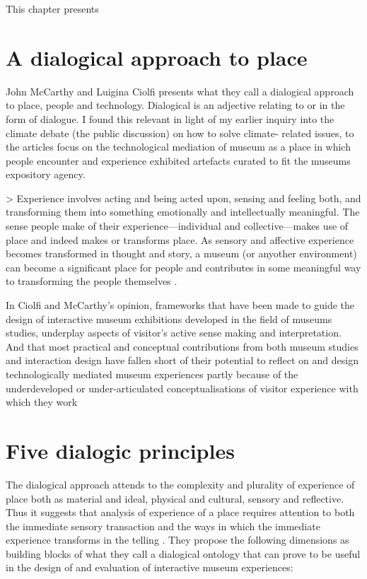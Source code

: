 This chapter presents 


\section{A dialogical approach to place}
John McCarthy and Luigina Ciolfi presents what they call a dialogical approach to place, people and technology. Dialogical is an adjective relating to or in the form of dialogue. I found this relevant in light of my earlier inquiry into the climate debate (the public discussion) on how to solve climate- related issues, to the articles focus on the technological mediation of museum as a place in which people encounter and experience exhibited artefacts curated to fit the museums expository agency.

> Experience involves acting and being acted upon, sensing and feeling both, and transforming them into something emotionally and intellectually meaningful. The sense people make of their experience—individual and collective—makes use of place and indeed makes or transforms place. As sensory and affective experience becomes transformed in thought and story, a museum (or anyother environment) can become a significant place for people and contributes in some meaningful way to transforming the people themselves \autocite[p. 250]{mccarthy_place}.

In Ciolfi and McCarthy’s opinion, frameworks that have been made to guide the design of interactive museum exhibitions developed in the field of museums studies, underplay aspects of visitor’s active sense making and interpretation. And that most practical and conceptual contributions from both museum studies and interaction design have fallen short of their potential to reflect on and design technologically mediated museum experiences partly because of the underdeveloped or under-articulated conceptualisations of visitor experience with which they work \autocite[p. 248]{mccarthy_place}


\section{Five dialogic principles}
The dialogical approach attends to the complexity and plurality of experience of place both as material and ideal, physical and cultural, sensory and reflective. Thus it suggests that analysis of experience of a place requires attention to both the immediate sensory transaction and the ways in which the immediate experience transforms in the telling \autocite[p. 251]{mccarthy_place}. They propose the following dimensions as building blocks of what they call a dialogical ontology that can prove to be useful in the design of and evaluation of interactive museum experiences:

